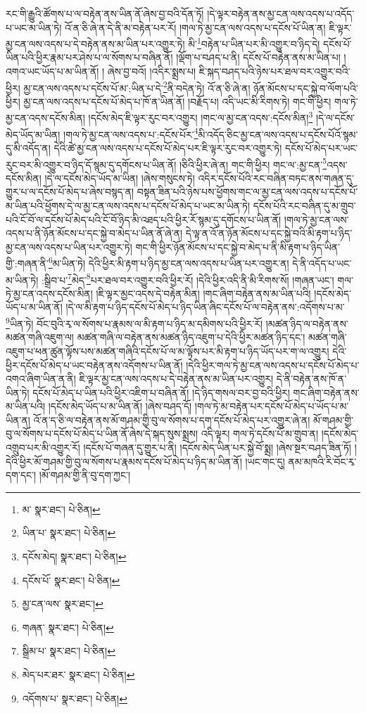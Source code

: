 རང་གི་རྒྱུའི་ཚོགས་པ་ལ་བརྟེན་ནས་ཡིན་ནོ་ཞེས་བྱ་བའི་དོན་ཏོ། །དེ་ལྟར་བརྟེན་ནས་མྱ་ངན་ལས་འདས་པ་འདོད་པ་ཡང་མ་ཡིན་ཏེ། འོ་ན་ཅི་ཞེ་ན་དེ་ནི་མ་བརྟེན་པར་རོ། །གལ་ཏེ་མྱ་ངན་ལས་འདས་པ་དངོས་པོ་ཡིན་ན། ཇི་ལྟར་མྱ་ངན་ལས་འདས་པ་དེ་བརྟེན་ནས་མ་ཡིན་པར་འགྱུར་ཏེ། མི་\footnote{མ་  སྣར་ཐང་།  པེ་ཅིན། }བརྟེན་པ་ཡིན་པར་མི་འགྱུར་བ་ཉིད་དེ། དངོས་པོ་ཡིན་པའི་ཕྱིར་རྣམ་པར་ཤེས་པ་ལ་སོགས་པ་བཞིན་ནོ། །ལྡོག་པ་བཤད་པ་ནི། དངོས་པོ་བརྟེན་ནས་མ་ཡིན་པ། །འགའ་ཡང་ཡོད་པ་མ་ཡིན་ནོ། །
ཞེས་བྱ་བའོ། །འདིར་སྨྲས་པ། ཇི་སྐད་བཤད་པའི་ཉེས་པར་ཐལ་བར་འགྱུར་བའི་ཕྱིར། མྱ་ངན་ལས་འདས་པ་དངོས་པོ་མ་:ཡིན་པ་དེ་\footnote{ཡིན་པ་  སྣར་ཐང་།  པེ་ཅིན། }ནི་བདེན་ཏེ། འོ་ན་ཅི་ཞེ་ན། ཉོན་མོངས་པ་དང་སྐྱེ་བ་ལོག་པའི་ཕྱིར། མྱ་ངན་ལས་འདས་པ་དངོས་པོ་མེད་པ་ཁོ་ན་ཡིན་ནོ། །བརྗོད་པ། འདི་ཡང་མི་རིགས་ཏེ། གང་གི་ཕྱིར། གལ་ཏེ་མྱ་ངན་འདས་དངོས་མིན། །དངོས་མེད་ཇི་ལྟར་རུང་བར་འགྱུར། །གང་ལ་མྱ་ངན་འདས་:དངོས་མིན།\footnote{དངོས་མེད།  སྣར་ཐང་།  པེ་ཅིན། } །དེ་ལ་དངོས་མེད་ཡོད་མ་ཡིན། །གལ་ཏེ་མྱ་ངན་ལས་འདས་པ་:དངོས་པོར་\footnote{དངོས་པོ་  སྣར་ཐང་།  པེ་ཅིན། }མི་འདོད་ཅིང་མྱ་ངན་ལས་འདས་པ་དངོས་པོའོ་སྙམ་དུ་མི་འདོད་ན། དེའི་ཚེ་མྱ་ངན་ལས་འདས་པ་དངོས་པོ་མེད་པར་ཇི་ལྟར་རུང་བར་འགྱུར་ཏེ། དངོས་པོ་མེད་པར་ཡང་རུང་བར་མི་འགྱུར་བ་ཉིད་དོ་སྙམ་དུ་དགོངས་པ་ཡིན་ནོ། །ཅིའི་ཕྱིར་ཞེ་ན། གང་གི་ཕྱིར། གང་ལ་:མྱ་ངན་\footnote{མྱ་ངན་ལས་  སྣར་ཐང་། }འདས་དངོས་མིན། །དེ་ལ་དངོས་མེད་ཡོད་མ་ཡིན། །ཞེས་གསུངས་ཏེ། འདིར་དངོས་པོའི་རང་བཞིན་བཏང་ནས་གཞན་དུ་གྱུར་པ་ལ་དངོས་པོ་མེད་པ་ཞེས་བསྙད་ན། བསྟན་ཟིན་པའི་ཉེས་པས་ཕྱོགས་གང་ལ་མྱ་ངན་ལས་འདས་པ་དངོས་པོ་མ་ཡིན་པའི་ཕྱོགས་དེ་ལ་མྱ་ངན་ལས་འདས་པ་དངོས་པོ་མེད་པ་ཡང་མ་ཡིན་ཏེ། དངོས་པོའི་རང་བཞིན་དུ་མ་གྲུབ་པའི་ངོ་བོ་ལ་དངོས་པོ་མེད་པའི་ངོ་བོ་ཉིད་མི་འཐད་པའི་ཕྱིར་རོ་སྙམ་དུ་དགོངས་པ་ཡིན་ནོ། །གལ་ཏེ་མྱ་ངན་ལས་འདས་པ་ནི་ཉོན་མོངས་པ་དང་སྐྱེ་བ་མེད་པ་ཡིན་ནོ་ཞེ་ན། དེ་ལྟ་ན་འོ་ན་ཉོན་མོངས་པ་དང་སྐྱེ་བའི་མི་རྟག་པ་ཉིད་མྱ་ངན་ལས་འདས་པ་ཡིན་པར་འགྱུར་ཏེ། གང་གི་ཕྱིར་ཉོན་མོངས་པ་དང་སྐྱེ་བ་མེད་པ་ནི་མི་རྟག་པ་ཉིད་ཡིན་གྱི་:གཞན་ནི་\footnote{གཞན་  སྣར་ཐང་།  པེ་ཅིན། }མ་ཡིན་ཏེ། དེའི་ཕྱིར་མི་རྟག་པ་ཉིད་མྱ་ངན་ལས་འདས་པ་ཡིན་པར་འགྱུར་ན། དེ་ནི་འདོད་པ་ཡང་མ་ཡིན་ཏེ། :སྒྲིབ་པ་\footnote{སྒྲིམ་པ་  སྣར་ཐང་།  པེ་ཅིན། }མེད་\footnote{མེད་པར་ཐར་  སྣར་ཐང་།  པེ་ཅིན། }པར་ཐལ་བར་འགྱུར་བའི་ཕྱིར་རོ། །དེའི་ཕྱིར་འདི་ནི་མི་རིགས་སོ། །གཞན་ཡང་། གལ་ཏེ་མྱ་ངན་འདས་དངོས་མིན། །ཇི་ལྟར་མྱང་འདས་དེ་བརྟེན་མིན། །གང་ཞིག་བརྟེན་ནས་མ་ཡིན་པའི། །དངོས་མེད་ཡོད་པ་མ་ཡིན་ནོ། །དེ་ལ་མི་རྟག་པ་ཉིད་དངོས་པོ་མེད་པ་ཉིད་ཡིན་ཞིང་དངོས་པོ་ལ་བརྟེན་ནས་:འདོགས་པ་མ་\footnote{འདོགས་པ་  སྣར་ཐང་།  པེ་ཅིན། }ཡིན་ཏེ། བོང་བུའི་རྭ་ལ་སོགས་པ་རྣམས་ལ་མི་རྟག་པ་ཉིད་མ་དམིགས་པའི་ཕྱིར་རོ། །མཚན་ཉིད་ལ་བརྟེན་ནས་མཚན་གཞི་འཇུག་ལ། མཚན་གཞི་ལ་བརྟེན་ནས་མཚན་ཉིད་འཇུག་པ་དེའི་ཕྱིར་མཚན་ཉིད་དང་། མཚན་གཞི་འཇུག་པ་ཕན་ཚུན་ལྟོས་པས་མཚན་གཞིའི་དངོས་པོ་ལ་མ་ལྟོས་པར་མི་རྟག་པ་ཉིད་ཡོད་པར་ག་ལ་འགྱུར། དེའི་ཕྱིར་དངོས་པོ་མེད་པ་ཡང་བརྟེན་ནས་འདོགས་པ་ཡིན་ནོ། །དེའི་ཕྱིར་གལ་ཏེ་མྱ་ངན་ལས་འདས་པ་དངོས་པོ་མེད་པ་འགའ་ཞིག་ཡིན་ན་ནི། ཇི་ལྟར་མྱ་ངན་ལས་འདས་པ་དེ་བརྟེན་ནས་མ་ཡིན་པར་འགྱུར། དེ་ནི་བརྟེན་ནས་ཁོ་ན་ཡིན་ཏེ། དངོས་པོ་མེད་པ་ཡིན་པའི་ཕྱིར་འཇིག་པ་བཞིན་ནོ། །དེ་ཉིད་གསལ་བར་བྱ་བའི་ཕྱིར། གང་ཞིག་བརྟེན་ནས་མ་ཡིན་པའི། །དངོས་མེད་ཡོད་པ་མ་ཡིན་ནོ། །ཞེས་བཤད་དོ། །གལ་ཏེ་མ་བརྟེན་པར་དངོས་པོ་མེད་པ་ཡོད་པ་མ་ཡིན་ན། འོ་ན་ད་ཅི་ལ་བརྟེན་ནས་མོ་གཤམ་གྱི་བུ་ལ་སོགས་པ་དག་དངོས་པོ་མེད་པར་འགྱུར་ཞེ་ན། མོ་གཤམ་གྱི་བུ་ལ་སོགས་པ་དངོས་པོ་མེད་པ་ཡིན་ནོ་ཞེས་དེ་སྐད་སུས་སྨྲས། འདི་ལྟར། གལ་ཏེ་དངོས་པོ་མ་གྲུབ་ན། །དངོས་མེད་འགྲུབ་པར་མི་འགྱུར་རོ། །དངོས་པོ་གཞན་དུ་གྱུར་པ་ནི། །དངོས་མེད་ཡིན་པར་སྐྱེ་བོ་སྨྲ། །ཞེས་སྔར་བཤད་ཟིན་ཏོ། །དེའི་ཕྱིར་མོ་གཤམ་གྱི་བུ་ལ་སོགས་པ་རྣམས་དངོས་པོ་མེད་པ་ཉིད་མ་ཡིན་ནོ། །ཡང་གང་དུ། ནམ་མཁའི་རི་བོང་རྭ་དག་དང་། །མོ་གཤམ་གྱི་ནི་བུ་དག་ཀྱང་། 